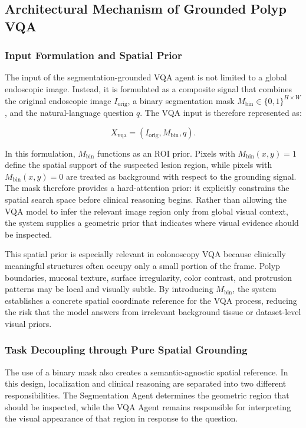 \subsection{Architectural Mechanism of Grounded Polyp VQA}

\subsubsection{Input Formulation and Spatial Prior}
The input of the segmentation-grounded VQA agent is not limited to a global endoscopic image. Instead, it is formulated as a composite signal that combines the original endoscopic image $I_{\mathrm{orig}}$, a binary segmentation mask $M_{\mathrm{bin}} \in \{0,1\}^{H \times W}$, and the natural-language question $q$. The VQA input is therefore represented as:

\begin{equation}
X_{\mathrm{vqa}} = \left(I_{\mathrm{orig}}, M_{\mathrm{bin}}, q\right).
\end{equation}

In this formulation, $M_{\mathrm{bin}}$ functions as an ROI prior. Pixels with $M_{\mathrm{bin}}(x,y)=1$ define the spatial support of the suspected lesion region, while pixels with $M_{\mathrm{bin}}(x,y)=0$ are treated as background with respect to the grounding signal. The mask therefore provides a hard-attention prior: it explicitly constrains the spatial search space before clinical reasoning begins. Rather than allowing the VQA model to infer the relevant image region only from global visual context, the system supplies a geometric prior that indicates where visual evidence should be inspected.

This spatial prior is especially relevant in colonoscopy VQA because clinically meaningful structures often occupy only a small portion of the frame. Polyp boundaries, mucosal texture, surface irregularity, color contrast, and protrusion patterns may be local and visually subtle. By introducing $M_{\mathrm{bin}}$, the system establishes a concrete spatial coordinate reference for the VQA process, reducing the risk that the model answers from irrelevant background tissue or dataset-level visual priors.

\subsubsection{Task Decoupling through Pure Spatial Grounding}
The use of a binary mask also creates a semantic-agnostic spatial reference. In this design, localization and clinical reasoning are separated into two different responsibilities. The Segmentation Agent determines the geometric region that should be inspected, while the VQA Agent remains responsible for interpreting the visual appearance of that region in response to the question.

